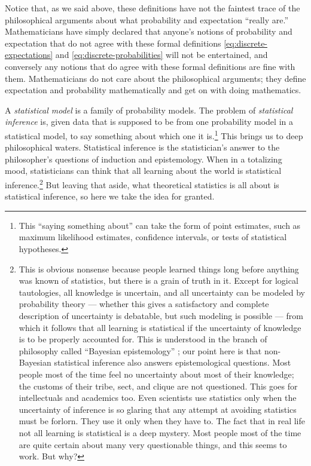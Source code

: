 \documentclass[11pt]{article}
\begin{document}
Notice that, as we said above, these definitions have not the faintest trace
of the philosophical arguments about what probability and expectation ``really
are.''  Mathematicians have simply declared that anyone's notions
of probability and expectation that do not agree with these formal
definitions \eqref{eq:discrete-expectations}
and \eqref{eq:discrete-probabilities} will not be entertained,
and conversely any notions that do agree with these formal definitions
are fine with them.  Mathematicians do not care about the philosophical
arguments; they define expectation and probability mathematically and get
on with doing mathematics.

A \emph{statistical model} is a family of probability models.  The problem
of \emph{statistical inference} is, given data that is supposed to be from
one probability model in a statistical model, to say something about which
one it is.\footnote{This ``saying something about'' can take the form of
point estimates, such as maximum likelihood estimates, confidence intervals,
or tests of statistical hypotheses.\label{foot:infer}}
This brings us to deep philosophical waters.  Statistical
inference is the statistician's answer to the philosopher's questions of
induction and epistemology.  When in a totalizing mood, statisticians can
think that all learning about the world is statistical
inference.\footnote{This is obvious nonsense because people learned things
long before anything was known of statistics, but there is a grain of truth
in it.  Except for logical tautologies, all knowledge is uncertain, and all
uncertainty can be modeled by probability theory --- whether this gives a
satisfactory and complete description of uncertainty is debatable, but such
modeling is possible --- from which it follows that all learning is statistical
if the uncertainty of knowledge is to be properly accounted for.  This is understood in the branch of philosophy called ``Bayesian epistemology''
\citep{talbott}; our point here is that non-Bayesian statistical inference
also answers epistemological questions.   Most people
most of the time feel no uncertainty about most of their knowledge; the
customs of their tribe, sect, and clique are not questioned.  This goes for
intellectuals and academics too.  Even scientists use statistics only when
the uncertainty of inference is so glaring that any attempt at avoiding
statistics must be forlorn.  They use it only when they have to.  The fact
that in real life not all learning is statistical is a deep mystery.  Most
people most of the time are quite certain about many very questionable things,
and this seems to work.  But why?}  But leaving that aside, what theoretical
statistics is all about is statistical inference, so here we take the idea for
granted.
\end{document}

